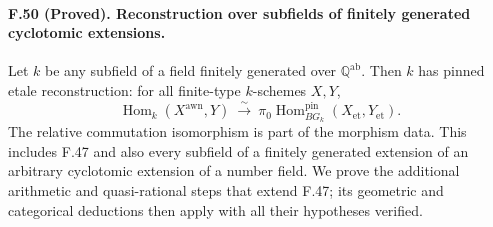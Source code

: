 \paragraph{F.50 (Proved). Reconstruction over subfields of finitely generated cyclotomic extensions.}
Let $k$ be any subfield of a field finitely generated over
$\mathbb Q^{\mathrm{ab}}$. Then $k$ has pinned etale reconstruction:
for all finite-type $k$-schemes $X,Y$,
\[
 \operatorname{Hom}_k(X^{\mathrm{awn}},Y)
  \ \xrightarrow{\ \sim\ }\
 \pi_0\operatorname{Hom}^{\mathrm{pin}}_{B G_k}
             (X_{\mathrm{et}},Y_{\mathrm{et}}).
 \tag{F50}
\]
The relative commutation isomorphism is part of the morphism data.
This includes F.47 and also every subfield of a finitely generated
extension of an arbitrary cyclotomic extension of a number field.
We prove the additional arithmetic and quasi-rational steps that
extend F.47; its geometric and categorical deductions then apply
with all their hypotheses verified.

